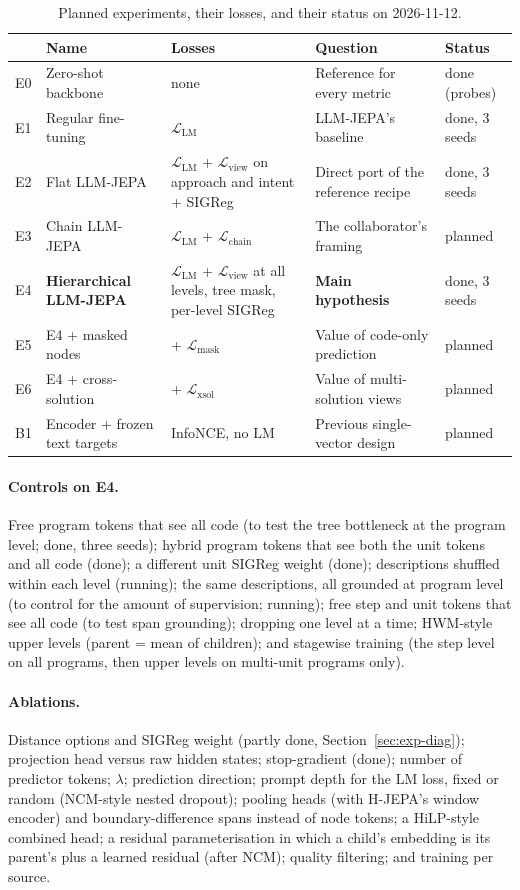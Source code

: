 \documentclass[11pt]{article}
\newcommand{\Lcal}{\mathcal{L}}
\begin{document}
\begin{table}[h]
\centering
\small
\caption{Planned experiments, their losses, and their status on 2026-11-12.}
\label{tab:experiments}
\begin{tabularx}{\textwidth}{@{}llYYl@{}}
\toprule
& Name & Losses & Question & Status \\
\midrule
E0 & Zero-shot backbone & none & Reference for every metric & done (probes) \\
E1 & Regular fine-tuning & $\Lcal_{\text{LM}}$ & LLM-JEPA's baseline & done, 3 seeds \\
E2 & Flat LLM-JEPA & $\Lcal_{\text{LM}}$ + $\Lcal_{\text{view}}$ on approach and intent + SIGReg & Direct port of the reference recipe & done, 3 seeds \\
E3 & Chain LLM-JEPA & $\Lcal_{\text{LM}}$ + $\Lcal_{\text{chain}}$ & The collaborator's framing & planned \\
E4 & \textbf{Hierarchical LLM-JEPA} & $\Lcal_{\text{LM}}$ + $\Lcal_{\text{view}}$ at all levels, tree mask, per-level SIGReg & \textbf{Main hypothesis} & done, 3 seeds \\
E5 & E4 + masked nodes & + $\Lcal_{\text{mask}}$ & Value of code-only prediction & planned \\
E6 & E4 + cross-solution & + $\Lcal_{\text{xsol}}$ & Value of multi-solution views & planned \\
B1 & Encoder + frozen text targets & InfoNCE, no LM & Previous single-vector design & planned \\
\bottomrule
\end{tabularx}
\end{table}

\paragraph{Controls on E4.}
Free program tokens that see all code (to test the tree bottleneck at the program level; done, three seeds);
hybrid program tokens that see both the unit tokens and all code (done); a different unit SIGReg weight (done);
descriptions shuffled within each level (running); the same descriptions, all grounded at program level (to control
for the amount of supervision; running); free step and unit tokens that see all code (to test span grounding);
dropping one level at a time; HWM-style upper levels (parent = mean of children); and stagewise training (the step
level on all programs, then upper levels on multi-unit programs only).

\paragraph{Ablations.}
Distance options and SIGReg weight (partly done, Section~\ref{sec:exp-diag}); projection head versus raw hidden
states; stop-gradient (done); number of predictor tokens; $\lambda$; prediction direction; prompt depth for the LM
loss, fixed or random (NCM-style nested dropout); pooling heads (with H-JEPA's window encoder) and
boundary-difference spans instead of node tokens; a HiLP-style combined head; a residual parameterisation in which a
child's embedding is its parent's plus a learned residual (after NCM); quality filtering; and training per source.
\end{document}
